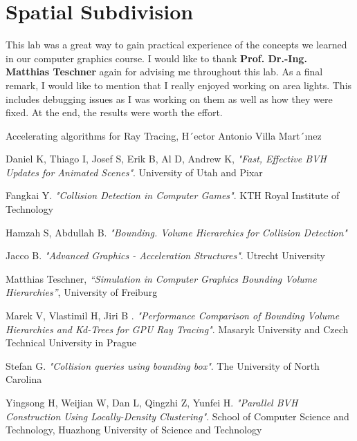 \documentclass[11pt,a4paper]{article}
\begin{document}
	\section{Spatial Subdivision}
	
	This lab was a great way to gain practical experience of the concepts we learned in our computer graphics course. I would like to thank \textbf{Prof. Dr.-Ing. Matthias Teschner} again for advising me throughout this lab. As a final remark, I would like to mention that I really enjoyed working on area lights. This includes debugging issues as I was working on them as well as how they were fixed. At the end, the results were worth the effort.
	
	
	Accelerating algorithms for Ray Tracing, H´ector Antonio Villa Mart´ınez
	
	Daniel K, Thiago I, Josef S, Erik B, Al D, Andrew K, 	\textit{"Fast, Effective BVH Updates for Animated Scenes"}. University of Utah and Pixar
	
	Fangkai Y. 	\textit{"Collision Detection in Computer Games"}. KTH Royal Institute of Technology
	
	Hamzah S, Abdullah B. 	\textit{"Bounding. Volume Hierarchies for Collision Detection"}
	
	Jacco B. 	\textit{"Advanced Graphics - Acceleration Structures"}. Utrecht University
	
	Matthias Teschner, 	\textit{“Simulation in Computer Graphics Bounding Volume Hierarchies”}, University of Freiburg
	
	Marek V, Vlastimil H, Jiri B .	\textit{"Performance Comparison of Bounding Volume Hierarchies and Kd-Trees for GPU Ray Tracing"}. Masaryk University and Czech Technical University in Prague
	
	Stefan G.	\textit{"Collision queries using bounding box"}. The University of North Carolina
	
	Yingsong H, Weijian W, Dan L, Qingzhi Z, Yunfei H. \textit{"Parallel BVH Construction Using Locally-Density Clustering"}. School of Computer Science and Technology, Huazhong University of Science and Technology
	
	
	
\end{document}
